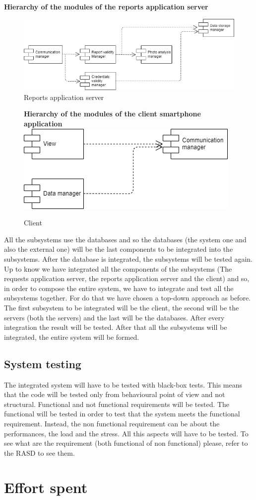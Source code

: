 \documentclass[titlepage]{article}
\begin{document}
\textbf{Hierarchy of the modules of the reports application server\\}
\begin{figure}[h]
\includegraphics[scale=0.5]{Diagrams/report application server.png}
	\caption{Reports application server}
\end{figure}
\FloatBarrier


\begin{figure}[h]
\textbf{Hierarchy of the modules of the client smartphone application}
\includegraphics[scale=0.5]{Diagrams/Client.png}
	\caption{Client}
\end{figure}
\FloatBarrier

All the subsystems use the databases and so the databases (the system one and also the external one) will be the last components to be integrated into the subsystems. After the database is integrated, the subsystems will be tested again.\\

Up to know we have integrated all the components of the subsystems (The requests application server, the reports application server and the client) and so, in order to compose the entire system, we have to integrate and test all the subsystems together. For do that we have chosen a top-down approach as before. The first subsystem to be integrated will be the client, the second will be the servers (both the servers) and the last will be the databases. After every integration the result will be tested. After that all the subsystems will be integrated, the entire system will be formed.

\subsection{System testing}
The integrated system will have to be tested with black-box tests. This means that the code will be tested only from behavioural point of view and not structural. Functional and not functional requirements will be tested. The functional will be tested in order to test that the system meets the functional requirement. Instead, the non functional requirement can be about the performances, the load and the stress. All this aspects will have to be tested. To see what are the requirement (both functional of non functional) please, refer to the RASD to see them. 

\section{Effort spent}
\end{document}

